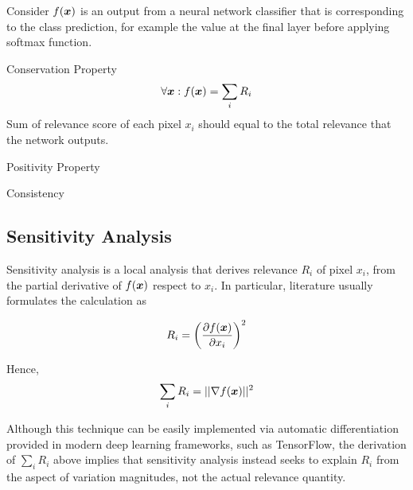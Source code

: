 Consider $f(\patvector{x})$ is an output from a neural network classifier that is corresponding to the class prediction, for example the value at the final layer before applying softmax function.
\begin{definition} Conservation Property
\begin{align*}
	\forall \patvector{x} : f(\patvector{x}) = \sum_i R_i
\end{align*}
Sum of relevance score of each pixel $x_i$ should equal to the total relevance that the network outputs.

\end{definition}
\begin{definition} Positivity Property
\end{definition}
\begin{definition} Consistency
\end{definition}

\subsection{Sensitivity Analysis}
Sensitivity analysis\cite{SimonyanDeepConvolutionalNetworks2013} is a local analysis that derives relevance $R_i$ of pixel $x_i$, from the partial derivative of $f(\patvector{x})$ respect to $x_i$. In particular, literature usually formulates the calculation as 

\begin{align*}
	R_i =
	 \bigg( \frac{\partial f(\patvector{x})}{ \partial x_i } \bigg)^2
\end{align*}

Hence, 
\begin{align*}
	\sum_i R_i = || \nabla f(\patvector{x}) ||^2
\end{align*}

Although this technique can be easily implemented via automatic differentiation provided in modern deep learning frameworks, such as TensorFlow\cite{AbadiTensorFlowLargeScaleMachine2016}, the derivation of $\sum_i R_i$ above implies that sensitivity analysis instead seeks to explain $R_i$ from the aspect of variation magnitudes, not the actual relevance quantity.

